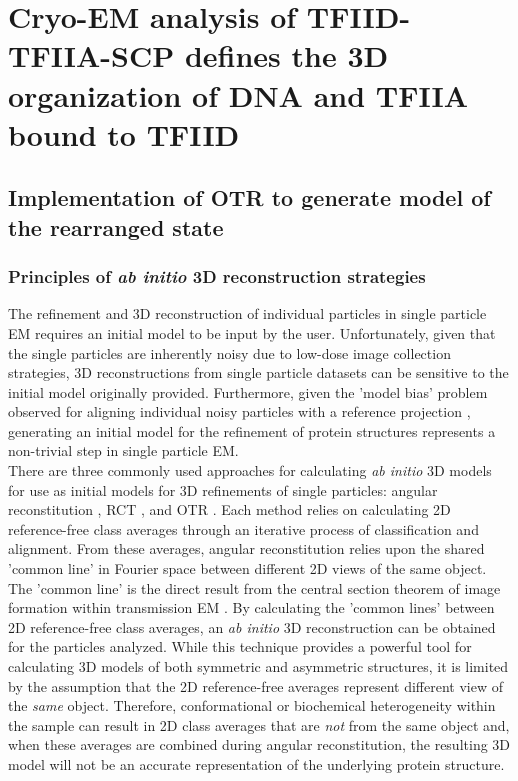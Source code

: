 \chapter{Cryo-EM analysis of TFIID-TFIIA-SCP defines the 3D organization of DNA and TFIIA bound to TFIID}

\section{Implementation of OTR to generate model of the rearranged state}

\subsection{Principles of \emph{ab initio} 3D reconstruction strategies}

The refinement and 3D reconstruction of individual particles in single particle EM requires an initial model to be input by the user. Unfortunately, given that the single particles are inherently noisy due to low-dose image collection strategies, 3D reconstructions from single particle datasets can be sensitive to the initial model originally provided. Furthermore, given the 'model bias' problem observed for aligning individual noisy particles with a reference projection \cite{Stewart_2004}, generating an initial model for the refinement of protein structures represents a non-trivial step in single particle EM. \\
\indent There are three commonly used approaches for calculating \emph{ab initio} 3D models for use as initial models for 3D refinements of single particles: angular reconstitution \cite{VanHeel_1987}, RCT \cite{Radermacher_1987}, and OTR  \cite{Leschziner_1228}. Each method relies on calculating 2D reference-free class averages through an iterative process of classification and alignment. From these averages, angular reconstitution relies upon the shared 'common line' in Fourier space between different 2D views of the same object. The 'common line' is the direct result from the central section theorem of image formation within transmission EM \cite{DeRosier_1968}. By calculating the 'common lines' between 2D reference-free class averages, an \emph{ab initio} 3D reconstruction can be obtained for the particles analyzed. While this technique provides a powerful tool for calculating 3D models of both symmetric and asymmetric structures, it is limited by the assumption that the 2D reference-free averages represent different view of the \emph{same} object. Therefore, conformational or biochemical heterogeneity within the sample can result in 2D class averages that are \emph{not} from the same object and, when these averages are combined during angular reconstitution, the resulting 3D model will not be an accurate representation of the underlying protein structure.\\
